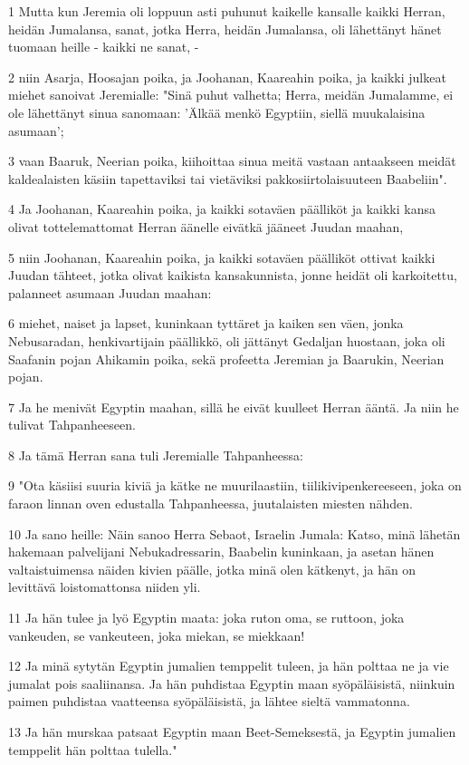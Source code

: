 \par 1 Mutta kun Jeremia oli loppuun asti puhunut kaikelle kansalle kaikki Herran, heidän Jumalansa, sanat, jotka Herra, heidän Jumalansa, oli lähettänyt hänet tuomaan heille - kaikki ne sanat, -
\par 2 niin Asarja, Hoosajan poika, ja Joohanan, Kaareahin poika, ja kaikki julkeat miehet sanoivat Jeremialle: "Sinä puhut valhetta; Herra, meidän Jumalamme, ei ole lähettänyt sinua sanomaan: 'Älkää menkö Egyptiin, siellä muukalaisina asumaan';
\par 3 vaan Baaruk, Neerian poika, kiihoittaa sinua meitä vastaan antaakseen meidät kaldealaisten käsiin tapettaviksi tai vietäviksi pakkosiirtolaisuuteen Baabeliin".
\par 4 Ja Joohanan, Kaareahin poika, ja kaikki sotaväen päälliköt ja kaikki kansa olivat tottelemattomat Herran äänelle eivätkä jääneet Juudan maahan,
\par 5 niin Joohanan, Kaareahin poika, ja kaikki sotaväen päälliköt ottivat kaikki Juudan tähteet, jotka olivat kaikista kansakunnista, jonne heidät oli karkoitettu, palanneet asumaan Juudan maahan:
\par 6 miehet, naiset ja lapset, kuninkaan tyttäret ja kaiken sen väen, jonka Nebusaradan, henkivartijain päällikkö, oli jättänyt Gedaljan huostaan, joka oli Saafanin pojan Ahikamin poika, sekä profeetta Jeremian ja Baarukin, Neerian pojan.
\par 7 Ja he menivät Egyptin maahan, sillä he eivät kuulleet Herran ääntä. Ja niin he tulivat Tahpanheeseen.
\par 8 Ja tämä Herran sana tuli Jeremialle Tahpanheessa:
\par 9 "Ota käsiisi suuria kiviä ja kätke ne muurilaastiin, tiilikivipenkereeseen, joka on faraon linnan oven edustalla Tahpanheessa, juutalaisten miesten nähden.
\par 10 Ja sano heille: Näin sanoo Herra Sebaot, Israelin Jumala: Katso, minä lähetän hakemaan palvelijani Nebukadressarin, Baabelin kuninkaan, ja asetan hänen valtaistuimensa näiden kivien päälle, jotka minä olen kätkenyt, ja hän on levittävä loistomattonsa niiden yli.
\par 11 Ja hän tulee ja lyö Egyptin maata: joka ruton oma, se ruttoon, joka vankeuden, se vankeuteen, joka miekan, se miekkaan!
\par 12 Ja minä sytytän Egyptin jumalien temppelit tuleen, ja hän polttaa ne ja vie jumalat pois saaliinansa. Ja hän puhdistaa Egyptin maan syöpäläisistä, niinkuin paimen puhdistaa vaatteensa syöpäläisistä, ja lähtee sieltä vammatonna.
\par 13 Ja hän murskaa patsaat Egyptin maan Beet-Semeksestä, ja Egyptin jumalien temppelit hän polttaa tulella."

